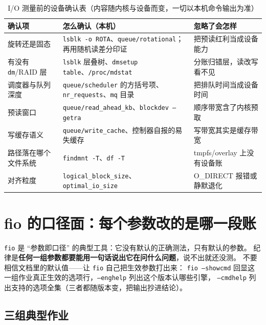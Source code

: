 \documentclass[12pt,a4paper,fontset=fandol]{ctexbook}
\newcommand{\Tp}[1]{\texttt{#1}}
\newcommand{\Bk}{\discretionary{}{}{}}
\begin{document}
\begin{table}[htbp]
\centering
\begin{tabularx}{\textwidth}{>{\raggedright\arraybackslash}p{} >{\raggedright\arraybackslash}X >{\raggedright\arraybackslash}p{}}
\toprule
确认项 & 怎么确认（本机） & 忽略了会怎样 \\
\midrule
旋转还是固态 & \Tp{lsblk -o ROTA}、\Tp{queue/rotational}；再用随机读差分印证 & 把预读红利当成设备能力 \\
有没有 \Tp{dm}/RAID 层 & \Tp{lsblk} 层叠树、\Tp{dmsetup table}、\Tp{/proc/mdstat} & 分账归错层，读改写看不见 \\
调度器与队列深度 & \Tp{queue/scheduler} 的方括号项、\Tp{nr{\Bk}\_requests}、\Tp{mq} 目录 & 把排队时间当成设备时间 \\
预读窗口 & \Tp{queue/read{\Bk}\_ahead{\Bk}\_kb}、\Tp{blockdev --getra} & 顺序带宽含了内核预取 \\
写缓存语义 & \Tp{queue/write{\Bk}\_cache}、控制器自报的易失缓存 & 写带宽其实是缓存带宽 \\
路径落在哪个文件系统 & \Tp{findmnt -T}、\Tp{df -T} & tmpfs/overlay 上没有设备账 \\
对齐粒度 & \Tp{logical{\Bk}\_block{\Bk}\_size}、\Tp{optimal{\Bk}\_io{\Bk}\_size} & O\_DIRECT 报错或静默退化 \\
\bottomrule
\end{tabularx}
\caption{I/O 测量前的设备确认表（内容随内核与设备而变，一切以本机命令输出为准）}
\label{tab:pm08-probe}
\end{table}

\section{fio 的口径面：每个参数改的是哪一段账}
\label{sec:pm08-fio}

\Tp{fio} 是 ``参数即口径'' 的典型工具：它没有默认的正确测法，只有默认的参数。
纪律是\textbf{任何一组参数都要能用一句话说出它在问什么问题}，说不出就还没测。
不要相信文档里的默认值——让 \Tp{fio} 自己把生效参数打出来：
\Tp{fio --showcmd} 回显这一组作业真正生效的选项行，\Tp{--enghelp} 列出这个版本认哪些引擎，
\Tp{--cmdhelp} 列出支持的选项全集（三者都随版本变，把输出抄进结论）。

\subsection{三组典型作业}
\label{sub:pm08-fio-jobs}
\end{document}
